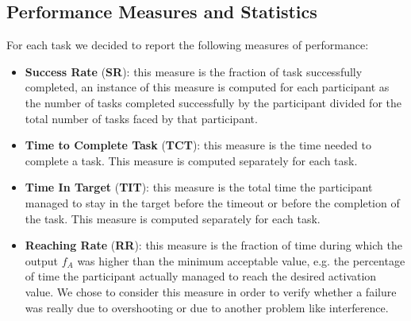 \subsection{Performance Measures and Statistics}
For each task we decided to report the following measures of performance:
\begin{itemize}
    \item \textbf{Success Rate} (\textbf{SR}): this measure is the fraction of task successfully completed, an instance of this measure is computed for each participant as the number of tasks completed successfully by the participant divided for the total number of tasks faced by that participant.
    \item \textbf{Time to Complete Task} (\textbf{TCT}): this measure is the time needed to complete a task. This measure is computed separately for each task.
    \item \textbf{Time In Target} (\textbf{TIT}): this measure is the total time the participant managed to stay in the target before the timeout or before the completion of the task. This measure is computed separately for each task.
    \item \textbf{Reaching Rate} (\textbf{RR}): this measure is the fraction of time during which the output $f_A$ was higher than the minimum acceptable value, e.g. the percentage of time the participant actually managed to reach the desired activation value.
    We chose to consider this measure in order to verify whether a failure was really due to overshooting or due to another problem like interference.
\end{itemize}